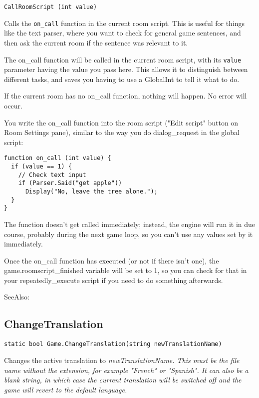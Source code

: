 \begin{verbatim}
CallRoomScript (int value)
\end{verbatim}

Calls the \verb$on_call$ function in the current room script. This is useful for things
like the text parser, where you want to check for general game sentences, and then ask
the current room if the sentence was relevant to it.

The on_call function will be called in the current room script, with its \verb$value$
parameter having the value you pass here. This allows it to distinguish between different
tasks, and saves you having to use a GlobalInt to tell it what to do.

If the current room has no on_call function, nothing will happen. No error will occur.

You write the on_call function into the room script ("Edit script" button on Room Settings
pane), similar to the way you do dialog_request in the global script:
\begin{verbatim}
function on_call (int value) {
  if (value == 1) {
    // Check text input
    if (Parser.Said("get apple"))
      Display("No, leave the tree alone.");
  }
}
\end{verbatim}

The function doesn't get called immediately; instead, the engine will run it in due course,
probably during the next game loop, so you can't use any values set by it immediately.

Once the on_call function has executed (or not if there isn't one), the
game.roomscript_finished  variable will be set to 1, so you can check for that in your
repeatedly_execute script if you need to do something afterwards.

SeeAlso: 


\subsection{ChangeTranslation}\label{Game.ChangeTranslation}%

\begin{verbatim}
static bool Game.ChangeTranslation(string newTranslationName)
\end{verbatim}
Changes the active translation to \it{newTranslationName}. This must be the file name without
the extension, for example "French" or "Spanish". It can also be a blank string, in which case
the current translation will be switched off and the game will revert to the default language.

